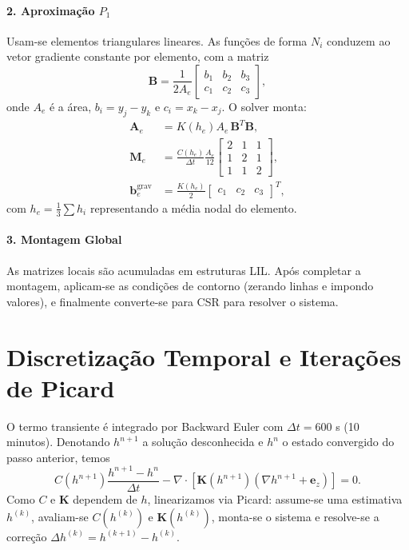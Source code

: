 \documentclass[a4paper,12pt]{article}
\begin{document}
\paragraph{2. Aproximação $P_1$} Usam-se elementos triangulares lineares. As funções de forma $N_i$ conduzem ao vetor gradiente constante por elemento, com a matriz
\begin{equation}
    \mathbf{B} = \frac{1}{2A_e}
    \begin{bmatrix}
        b_1 & b_2 & b_3 \\
        c_1 & c_2 & c_3
    \end{bmatrix},
\end{equation}
onde $A_e$ é a área, $b_i = y_j - y_k$ e $c_i = x_k - x_j$. O solver monta:
\begin{align}
    \mathbf{A}_e &= K(h_e) A_e \, \mathbf{B}^T \mathbf{B},\\
    \mathbf{M}_e &= \frac{C(h_e)}{\Delta t} \frac{A_e}{12}
    \begin{bmatrix}
        2 & 1 & 1 \\
        1 & 2 & 1 \\
        1 & 1 & 2
    \end{bmatrix},\\
    \mathbf{b}^{\text{grav}}_e &= \frac{K(h_e)}{2}
    \begin{bmatrix}c_1 & c_2 & c_3\end{bmatrix}^T,
\end{align}
com $h_e = \tfrac{1}{3}\sum h_i$ representando a média nodal do elemento.

\paragraph{3. Montagem Global} As matrizes locais são acumuladas em estruturas LIL. Após completar a montagem, aplicam-se as condições de contorno (zerando linhas e impondo valores), e finalmente converte-se para CSR para resolver o sistema.

\section{Discretização Temporal e Iterações de Picard}
O termo transiente é integrado por Backward Euler com $\Delta t = 600$ s (10 minutos). Denotando $h^{n+1}$ a solução desconhecida e $h^n$ o estado convergido do passo anterior, temos
\begin{equation}
    C(h^{n+1})\frac{h^{n+1}-h^n}{\Delta t} - \nabla \cdot \left[ \mathbf{K}(h^{n+1})(\nabla h^{n+1}+\mathbf{e}_z) \right] = 0.
\end{equation}
Como $C$ e $\mathbf{K}$ dependem de $h$, linearizamos via Picard: assume-se uma estimativa $h^{(k)}$, avaliam-se $C(h^{(k)})$ e $\mathbf{K}(h^{(k)})$, monta-se o sistema e resolve-se a correção $\Delta h^{(k)} = h^{(k+1)} - h^{(k)}$.
\end{document}
